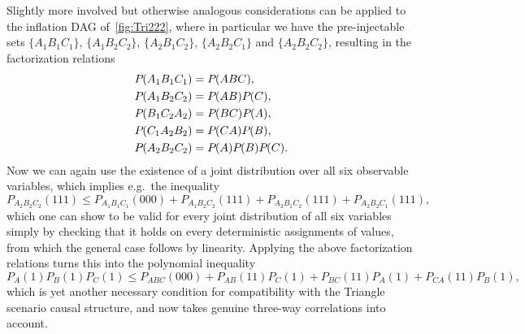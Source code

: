 Slightly more involved but otherwise analogous considerations can be applied to the inflation DAG of~\cref{fig:Tri222}, where in particular we have the pre-injectable sets $\{A_1 B_1 C_1\}$, $\{A_1 B_2 C_2\}$, $\{A_2 B_1 C_2\}$, $\{A_2 B_2 C_1\}$ and $\{A_2 B_2 C_2\}$, resulting in the factorization relations
\begin{align}
	{P_{}}\lparen A_1 B_1 C_1\rparen &= {P_{}}\lparen A B C\rparen, \\
	{P_{}}\lparen A_1 B_2 C_2\rparen &= {P_{}}\lparen A B\rparen {P_{}}\lparen C\rparen, \\
	{P_{}}\lparen B_1 C_2 A_2\rparen &= {P_{}}\lparen B C\rparen {P_{}}\lparen A\rparen, \\
	{P_{}}\lparen C_1 A_2 B_2\rparen &= {P_{}}\lparen C A\rparen {P_{}}\lparen B\rparen, \\
	{P_{}}\lparen A_2 B_2 C_2\rparen &= {P_{}}\lparen A\rparen {P_{}}\lparen B\rparen {P_{}}\lparen C\rparen .
\end{align}
Now we can again use the existence of a joint distribution over all six observable variables, which implies e.g.~the inequality
\[
	P_{A_2 B_2 C_2}(111) \leq P_{A_1 B_1 C_1}(000) + P_{A_1 B_2 C_2}(111) + P_{A_2 B_1 C_2}(111) + P_{A_2 B_2 C_1}(111),
\]
which one can show to be valid for every joint distribution of all six variables simply by checking that it holds on every deterministic assignments of values, from which the general case follows by linearity. Applying the above factorization relations turns this into the polynomial inequality
\begin{equation}
	P_{A}(1) P_{B}(1) P_{C}(1) \leq P_{ABC}(000) + P_{AB}(11) P_C(1) + P_{BC}(11) P_A(1) + P_{CA}(11) P_B(1),
\end{equation}
which is yet another necessary condition for compatibility with the Triangle scenario causal structure, and now takes genuine three-way correlations into account. 
